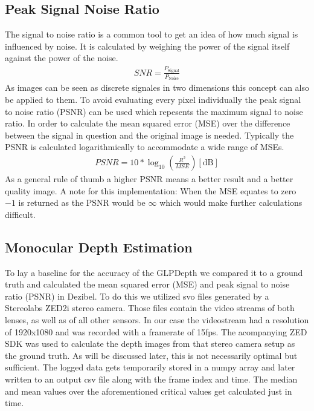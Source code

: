 \subsection{Peak Signal Noise Ratio}

The signal to noise ratio is a common tool to get an idea of how much signal is influenced by noise. It is calculated by weighing the power of the signal itself against the power of the noise.
\begin{align}
    SNR = \frac{P_{\text{Signal}}}{P_{\text{Noise}}}
\end{align}
As images can be seen as discrete signales in two dimensions this concept can also be applied to them. To avoid evaluating every pixel individually the peak signal to noise ratio (PSNR) can be used which repesents the maximum signal to noise ratio. In order to calculate the mean squared error (MSE) over the difference between the signal in question and the original image is needed. Typically the PSNR is calculated logarithmically to accommodate a wide range of MSEs.
\begin{align}
    PSNR = 10 * \log_10(\frac{R^2}{MSE}) [\mathrm{dB}]
\end{align}
As a general rule of thumb a higher PSNR means a better result and a better quality image.
A note for this implementation: When the MSE equates to zero $-1$ is returned as the PSNR would be $\infty$ which would make further calculations difficult.


\subsection{Monocular Depth Estimation} \label{mde_impl}

To lay a baseline for the accuracy of the GLPDepth we compared it to a ground truth and calculated the mean squared error (MSE) and peak signal to noise ratio (PSNR) in Dezibel. To do this we utilized svo files generated by a Stereolabs ZED2i stereo camera. Those files contain the video streams of both lenses, as well as of all other sensors. In our case the videostream had a resolution of 1920x1080 and was recorded with a framerate of 15fps.
The acompanying ZED SDK was used to calculate the depth images from that stereo camera setup as the ground truth. As will be discussed later, this is not necessarily optimal but sufficient.
The logged data gets temporarily stored in a numpy array and later written to an output csv file along with the frame index and time. The median and mean values over the aforementioned critical values get calculated just in time.


